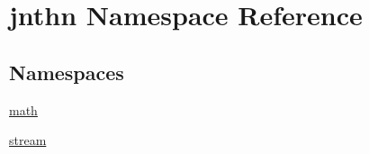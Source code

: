 \hypertarget{namespacejnthn}{\section{jnthn Namespace Reference}
\label{namespacejnthn}
}
\subsection*{Namespaces}
\begin{DoxyCompactItemize}
\item 
\hyperlink{namespacejnthn_1_1math}{math}
\item 
\hyperlink{namespacejnthn_1_1stream}{stream}
\end{DoxyCompactItemize}
